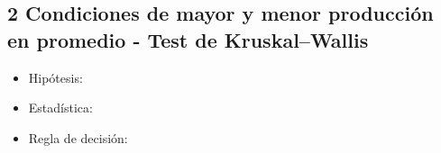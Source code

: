 \documentclass[
  11pt,
]{article}
\begin{document}
\subsection{2 Condiciones de mayor y menor producción en promedio - Test
de
Kruskal--Wallis}\label{condiciones-de-mayor-y-menor-producciuxf3n-en-promedio---test-de-kruskalwallis}

\begin{itemize}
\item
  Hipótesis:
\item
  Estadística:
\item
  Regla de decisión:
\end{itemize}
\end{document}
